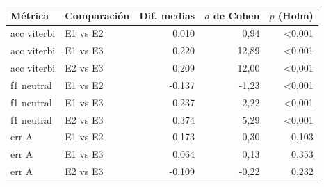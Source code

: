 \begin{tabular}{llrrr}
\toprule
Métrica & Comparación & Dif. medias & $d$ de Cohen & $p$ (Holm) \\
\midrule
acc viterbi & E1 vs E2 & 0,010 & 0,94 & <0,001 \\
acc viterbi & E1 vs E3 & 0,220 & 12,89 & <0,001 \\
acc viterbi & E2 vs E3 & 0,209 & 12,00 & <0,001 \\
f1 neutral & E1 vs E2 & -0,137 & -1,23 & <0,001 \\
f1 neutral & E1 vs E3 & 0,237 & 2,22 & <0,001 \\
f1 neutral & E2 vs E3 & 0,374 & 5,29 & <0,001 \\
err A & E1 vs E2 & 0,173 & 0,30 & 0,103 \\
err A & E1 vs E3 & 0,064 & 0,13 & 0,353 \\
err A & E2 vs E3 & -0,109 & -0,22 & 0,232 \\
\bottomrule
\end{tabular}